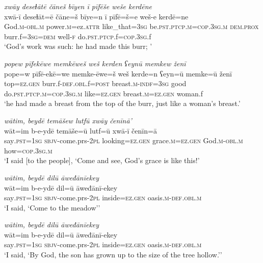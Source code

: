 \ea \label{ZQ.42}
\textit{xwāy deseɫātē čāneš bīyen ī pīfēše weše kerdēne} \\ 
\gll xwā-ī deseɫāt=ē čāne=š bīye=n ī pīfē=š=e weš-e kerdē=ne \\ 
 God\textsc{.m}\textsc{-obl}\textsc{.m} power\textsc{.m}=ez.\textsc{attr} like\_that\textsc{=3sg} be\textsc{.pst}\textsc{.ptcp}\textsc{.m}\textsc{=cop}\textsc{.3sg}\textsc{.m} \textsc{dem.prox} burr.f\textsc{=3sg}\textsc{=dem} well\textsc{-f} do\textsc{.pst}\textsc{.ptcp}.f\textsc{=cop}\textsc{.3sg}.f \\ 
\glt `God’s work was such: he had made this burr; '
\z 
 
\ea \label{ZQ.43}
\textit{popew pīfekēwe memkēweš weš kerden ʕeynū memkew ženī} \\ 
\gll pope=w pīfē-ekē=we memke-ēwe=š weš kerde=n ʕeyn=ū memke=ū ženī \\ 
 top\textsc{=ez.gen} burr.f\textsc{-def}\textsc{.obl}.f\textsc{=\textsc{post}} breast\textsc{.m}\textsc{-indf}\textsc{=3sg} good do\textsc{.pst}\textsc{.ptcp}\textsc{.m}\textsc{=cop}\textsc{.3sg}\textsc{.m} like\textsc{=ez.gen} breast\textsc{.m}\textsc{=ez.gen} woman.f \\ 
\glt `he had made a breast from the top of the burr, just like a woman’s breast.'
\z 
 
\ea \label{ZQ.46}
\textit{wātim, beydē temāšew lutfū xwāy čenīnā’} \\ 
\gll wāt=im b-e-ydē temāše=ū lutf=ū xwā-ī čenīn=ā \\ 
 say\textsc{.pst}\textsc{=\textsc{1sg}} \textsc{sbjv-}come.prs-\textsc{2pl} looking\textsc{=ez.gen} grace\textsc{.m}\textsc{=ez.gen} God\textsc{.m}\textsc{-obl}\textsc{.m} how\textsc{=cop}\textsc{.3sg}\textsc{.m} \\ 
\glt `I said [to the people], ‘Come and see, God’s grace is like this!'
\z 
 
\ea \label{ZQ.48}
\textit{wātim, beydē dilū āweđānīekey} \\ 
\gll wāt=im b-e-ydē dil=ū āweđānī-ekey \\ 
 say\textsc{.pst}\textsc{=\textsc{1sg}} \textsc{sbjv-}come.prs-\textsc{2pl} inside\textsc{=ez.gen} oasis\textsc{.m}\textsc{-def}\textsc{.obl}\textsc{.m} \\ 
\glt `I said, ‘Come to the meadow’'
\z 
 
\ea \label{ZQ.50}
\textit{wātim, beydē dilū āweđānīekey} \\ 
\gll wāt=im b-e-ydē dil=ū āweđānī-ekey \\ 
 say\textsc{.pst}\textsc{=\textsc{1sg}} \textsc{sbjv-}come.prs-\textsc{2pl} inside\textsc{=ez.gen} oasis\textsc{.m}\textsc{-def}\textsc{.obl}\textsc{.m} \\ 
\glt `I said, ‘By God, the son has grown up to the size of the tree hollow.’'
\z 
 
